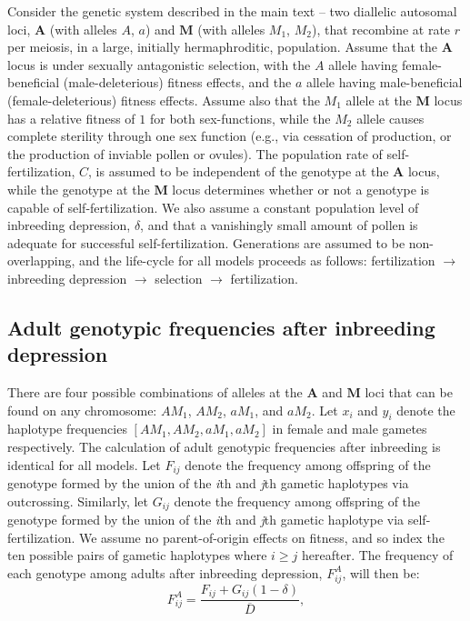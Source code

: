\documentclass{article}
\begin{document}
Consider the genetic system described in the main text -- two diallelic autosomal loci, $\mathbf{A}$ (with alleles $A$, $a$) and $\mathbf{M}$ (with alleles $M_1$, $M_2$), that recombine at rate $r$ per meiosis, in a large, initially hermaphroditic, population. Assume that the $\mathbf{A}$ locus is under sexually antagonistic selection, with the $A$ allele having female-beneficial (male-deleterious) fitness effects, and the $a$ allele having male-beneficial (female-deleterious) fitness effects. Assume also that the $M_1$ allele at the $\mathbf{M}$ locus has a relative fitness of $1$ for both sex-functions, while the $M_2$ allele causes complete sterility through one sex function (e.g., via cessation of production, or the production of inviable pollen or ovules). The population rate of self-fertilization, $C$, is assumed to be independent of the genotype at the $\mathbf{A}$ locus, while the genotype at the $\mathbf{M}$ locus determines whether or not a genotype is capable of self-fertilization. We also assume a constant population level of inbreeding depression, $\delta$, and that a vanishingly small amount of pollen is adequate for successful self-fertilization. Generations are assumed to be non-overlapping, and the life-cycle for all models proceeds as follows: fertilization $\rightarrow$ inbreeding depression $\rightarrow$ selection $\rightarrow$ fertilization.

\subsection*{Adult genotypic frequencies after inbreeding depression}

There are four possible combinations of alleles at the $\mathbf{A}$ and $\mathbf{M}$ loci that can be found on any chromosome: $A M_1$, $A M_2$, $a M_1$, and $a M_2$. Let $x_i$ and $y_i$ denote the haplotype frequencies $[AM_1,AM_2,aM_1,aM_2]$ in female and male gametes respectively. The calculation of adult genotypic frequencies after inbreeding is identical for all models. Let $F_{ij}$ denote the frequency among offspring of the genotype formed by the union of the \textit{i}th and \textit{j}th gametic haplotypes via outcrossing. Similarly, let $G_{ij}$ denote the frequency among offspring of the genotype formed by the union of the \textit{i}th and \textit{j}th gametic haplotype via self-fertilization. We assume no parent-of-origin effects on fitness, and so index the ten possible pairs of gametic haplotypes where $i \geq j$ hereafter. The frequency of each genotype among adults after inbreeding depression, $F^A_{ij}$, will then be:
\begin{equation} \label{eq:AdultFreq}
	F^A_{ij} = \frac{F_{ij} + G_{ij}(1 - \delta)}{\overline{D}},
\end{equation}
\end{document}
